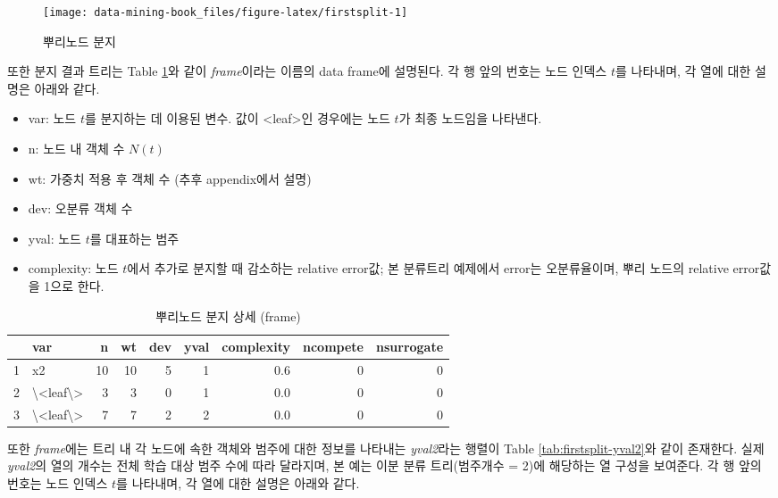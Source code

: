 \documentclass[]{book}
\providecommand{\tightlist}{%
  \setlength{\itemsep}{0pt}\setlength{\parskip}{0pt}}
\begin{document}
\begin{figure}

{\centering \texttt{[image: data-mining-book\_files/figure-latex/firstsplit-1]} 

}

\caption{뿌리노드 분지}\label{fig:firstsplit}
\end{figure}

또한 분지 결과 트리는 Table \ref{tab:firstsplit-frame}와 같이 \emph{frame}이라는 이름의 data frame에 설명된다. 각 행 앞의 번호는 노드 인덱스 \(t\)를 나타내며, 각 열에 대한 설명은 아래와 같다.

\begin{itemize}
\tightlist
\item
  var: 노드 \(t\)를 분지하는 데 이용된 변수. 값이 \textless{}leaf\textgreater{}인 경우에는 노드 \(t\)가 최종 노드임을 나타낸다.
\item
  n: 노드 내 객체 수 \(N(t)\)
\item
  wt: 가중치 적용 후 객체 수 (추후 appendix에서 설명)
\item
  dev: 오분류 객체 수
\item
  yval: 노드 \(t\)를 대표하는 범주
\item
  complexity: 노드 \(t\)에서 추가로 분지할 때 감소하는 relative error값; 본 분류트리 예제에서 error는 오분류율이며, 뿌리 노드의 relative error값을 1으로 한다.
\end{itemize}

\begin{table}[t]

\caption{\label{tab:firstsplit-frame}뿌리노드 분지 상세 (frame)}
\centering
\begin{tabular}{llrrrrrrr}
\toprule
  & var & n & wt & dev & yval & complexity & ncompete & nsurrogate\\
\midrule
1 & x2 & 10 & 10 & 5 & 1 & 0.6 & 0 & 0\\
2 & \textbackslash{}<leaf\textbackslash{}> & 3 & 3 & 0 & 1 & 0.0 & 0 & 0\\
3 & \textbackslash{}<leaf\textbackslash{}> & 7 & 7 & 2 & 2 & 0.0 & 0 & 0\\
\bottomrule
\end{tabular}
\end{table}

또한 \emph{frame}에는 트리 내 각 노드에 속한 객체와 범주에 대한 정보를 나타내는 \emph{yval2}라는 행렬이 Table \ref{tab:firstsplit-yval2}와 같이 존재한다. 실제 \emph{yval2}의 열의 개수는 전체 학습 대상 범주 수에 따라 달라지며, 본 예는 이분 분류 트리(범주개수 = 2)에 해당하는 열 구성을 보여준다. 각 행 앞의 번호는 노드 인덱스 \(t\)를 나타내며, 각 열에 대한 설명은 아래와 같다.
\end{document}

